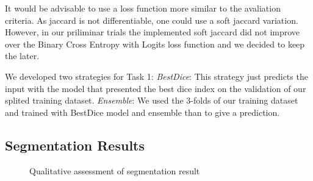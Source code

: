 \documentclass[conference]{IEEEtran}
\begin{document}
It would be advisable to use a loss function more similar to the avaliation criteria. As jaccard is not differentiable, one could use a soft jaccard variation\cite{iglovikov}. However, in our priliminar trials the implemented soft jaccard did not improve over the Binary Cross Entropy with Logits loss function and we decided to keep the later. 

We developed two strategies for Task 1:
\emph{BestDice}: This strategy just predicts the input with the model that presented the best dice index on the validation of our splited training dataset. 
\emph{Ensemble}: We used the 3-folds of our training dataset and trained with BestDice model and ensemble than to give a prediction. 

\subsection{Segmentation Results}

\begin{figure}
\centering
{}\hfil
{}
\caption{Qualitative assessment of segmentation result}\label{result_samples}
\end{figure}
\end{document}
